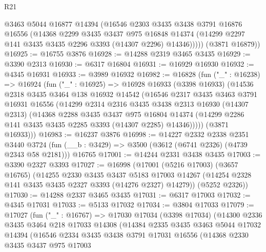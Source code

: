 \begin{lexlean}{R21}
\begin{coremodule}
          @3463
          @5044
          @16877
          @14394
          (@16546
            @2303
            @3435
            @3438
            @3791
            @16876
            @16556
            (@14368
              @2299
              @3435
              @3437
              @975
              @16848
              @14374
              (@14299 @2297 @141 @3435 @3435 @2296 @3393 (@14307 @2296) @14346)))))
      (@3871 @16879))
@16925 := @16755 @3876
@16928 := @14288 @2319 @3465 @3435
@16929 := @3390 @2313
@16930 := @6317 @16804
@16931 := @16929 @16930
@16932 := @4345 @16931
@16933 := @3989 @16932
@16982 := @16828
    (fun ("_" : @16238) =>
    @16924
      (fun ("_" : @16925) =>
      @16928
        @16933
        (@3398 @16933)
        (@14536
          @2318
          @3435
          @3464
          @138
          @16932
          @14542
          (@16546
            @2317
            @3435
            @3463
            @3791
            @16931
            @16556
            (@14299
              @2314
              @2316
              @3435
              @3438
              @2313
              @16930
              (@14307 @2313)
              (@14368
                @2288
                @3435
                @3437
                @975
                @16804
                @14374
                (@14299 @2286 @141 @3435 @3435 @2285 @3393 (@14307 @2285) @14346)))))
        (@3871 @16933)))
@16983 := @16237 @3876
@16998 := @14227
    @2332
    @2338
    @2351
    @3440
    @3724
    (fun (__b : @3429) => @3500 (@3612 (@6741 @2326) (@4739 @2343 @58 @2181)))
    @16765
@17001 := @14244 @2331 @3438 @3435
@17003 := @3390 @2327 @3393
@17027 := @16998
    (@17001
      (@5216 @17003)
      (@3657 @16765)
      (@14255
        @2330
        @3435
        @3437
        @5183
        @17003
        @14267
        (@14254 @2328 @141 @3435 @3435 @2327 @3393 (@14276 @2327) @14279))
      (@5252 @2326))
@17030 := @14288 @2337 @3465 @3435
@17031 := @6317 @17003
@17032 := @4345 @17031
@17033 := @5133 @17032
@17034 := @3804 @17033
@17079 := @17027
    (fun ("_" : @16767) =>
    @17030
      @17034
      (@3398 @17034)
      (@14300
        @2336
        @3435
        @3464
        @218
        @17033
        @14308
        (@14384
          @2335
          @3435
          @3463
          @5044
          @17032
          @14394
          (@16546
            @2334
            @3435
            @3438
            @3791
            @17031
            @16556
            (@14368
              @2330
              @3435
              @3437
              @975
              @17003

\end{coremodule}
\end{lexlean}
